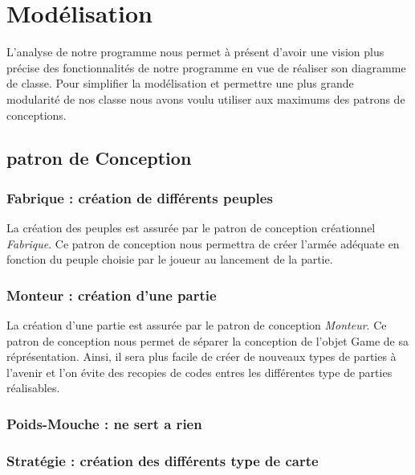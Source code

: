 \section{Modélisation}


	L'analyse de notre programme nous permet à présent d'avoir une vision plus précise des fonctionnalités de notre programme en vue de réaliser son diagramme de classe. Pour simplifier la modélisation et permettre une plus grande modularité de nos classe nous avons voulu utiliser aux maximums des patrons de conceptions. 

	\subsection{patron de Conception}
		\subsubsection{Fabrique : création de différents peuples}
		La création des peuples est assurée par le patron de conception créationnel \emph{Fabrique}. Ce patron de conception nous permettra de créer l'armée adéquate en fonction du peuple choisie par le joueur au lancement de la partie. 
		
		\subsubsection{Monteur : création d'une partie}
		La création d'une partie est assurée par le patron de conception \emph{Monteur}. Ce patron de conception nous permet de séparer la conception de l'objet Game de sa réprésentation. Ainsi, il sera plus facile de créer de nouveaux types de parties à l'avenir et l'on évite des recopies de codes entres les différentes type de parties réalisables.


		\subsubsection{Poids-Mouche : ne sert a rien}

		\subsubsection{Stratégie : création des différents type de carte}


